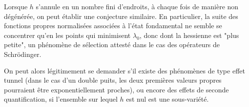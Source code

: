 Lorsque $h$ s'annule en un nombre fini d'endroits, à chaque fois de
manière non dégénérée, on peut établir une conjecture similaire. En particulier, la suite des fonctions propres normalisées associées à l'état fondamental ne semble se concentrer qu'en les points qui minimisent $\lambda_0$, donc dont la hessienne est "plus petite", un phénomène de sélection attesté dans le cas des opérateurs de Schr\"odinger.

On peut alors légitimement se demander s'il existe des phénomènes de type effet tunnel (dans le cas d'un double puits, les deux premières valeurs propres pourraient être exponentiellement proches), ou encore des effets de seconde quantification, si l'ensemble sur lequel $h$ est nul est une sous-variété.